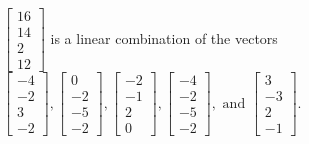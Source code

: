 \begin{exercise}
\begin{exerciseStatement}
  \end{exerciseStatement}
  \begin{exerciseAnswer}
   \(\left[\begin{array}{c}
16 \\
14 \\
2 \\
12
\end{array}\right]\) 
  	 is  
	a linear combination of the vectors \(\left[\begin{array}{c}
-4 \\
-2 \\
3 \\
-2
\end{array}\right] , \left[\begin{array}{c}
0 \\
-2 \\
-5 \\
-2
\end{array}\right] , \left[\begin{array}{c}
-2 \\
-1 \\
2 \\
0
\end{array}\right] , \left[\begin{array}{c}
-4 \\
-2 \\
-5 \\
-2
\end{array}\right] , \text{ and } \left[\begin{array}{c}
3 \\
-3 \\
2 \\
-1
\end{array}\right]\).

	
  


  \end{exerciseAnswer}
\end{exercise}